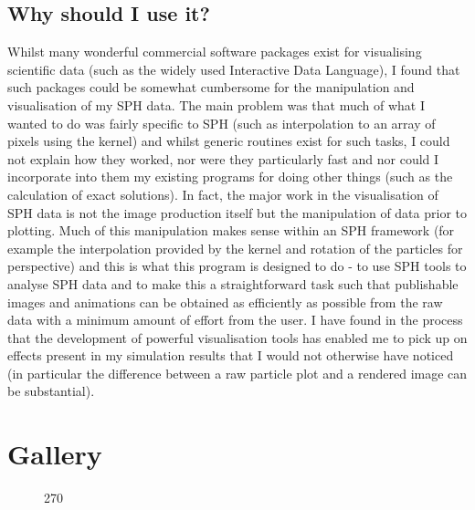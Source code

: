 \documentclass[a4paper,12pt]{article}
\begin{document}
\subsection{Why should I use it?}
 Whilst many wonderful commercial software packages exist for visualising scientific
data (such as the widely used Interactive Data Language), I found that such packages
could be somewhat cumbersome for the manipulation and visualisation of my SPH data. The
main problem was that much of what I wanted to do was fairly specific to SPH (such as
interpolation to an array of pixels using the kernel) and whilst generic routines exist
for such tasks, I could not explain how they worked, nor were they
particularly fast and nor could I incorporate into them my existing programs for doing
other things (such as the calculation of exact solutions). In fact, the major
work in the visualisation of SPH data is not the image production itself but the
manipulation of data prior to plotting. Much of this manipulation makes sense
within an SPH framework (for example the interpolation provided by the kernel
and rotation of the particles for perspective) and this is what this program is
designed to do - to use SPH tools to analyse SPH data and to make this a
straightforward task such that publishable images and animations can be obtained
as efficiently as possible from the raw data with a minimum amount of effort
from the user. I have found in the process that the development of powerful
visualisation tools has enabled me to pick up on effects present in my
simulation results that I would not otherwise have noticed (in particular the
difference between a raw particle plot and a rendered image can be substantial).

\section{Gallery}

\begin{figure}
\begin{center}
\begin{turn}{270}\end{turn}
\label{fig:hyperbolic}
\end{center}
\end{figure}
\end{document}
